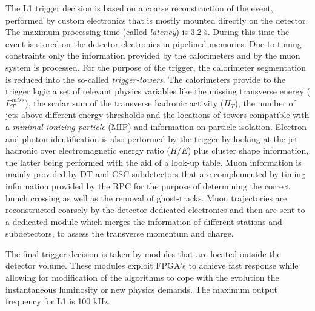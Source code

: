 The L1 trigger decision is based on a coarse reconstruction of the event, performed by custom electronics that is mostly mounted directly on the detector. 
The maximum processing time (called \emph{latency}) is 3.2 \u s. 
During this time the event is stored on the detector electronics in pipelined memories. 
Due to timing constraints only the information provided by the calorimeters and by the muon system is processed. 
For the purpose of the trigger, the calorimeter segmentation is reduced into the so-called \emph{trigger-towers}. 
The calorimeters provide to the trigger logic a set of relevant physics variables like the missing transverse energy ($E_T^{miss}$), the scalar sum of the transverse hadronic activity ($H_T$), the number of jets above different energy thresholds and the locations of towers compatible with a \emph{minimal ionizing particle} (MIP) and information on particle isolation. 
Electron and photon identification is also performed by the trigger by looking at the jet hadronic over electromagnetic energy ratio ($H/E$) plus cluster shape information, the latter being performed with the aid of a look-up table. 
Muon information is mainly provided by DT and CSC subdetectors that are complemented by timing information provided by the RPC for the purpose of determining the correct bunch crossing as well as the removal of ghost-tracks. 
Muon trajectories are reconstructed coarsely by the detector dedicated electronics and then are sent to a dedicated module which merges the information of different stations and subdetectors, to assess the transverse momentum  and charge. 

The final trigger decision is taken by modules that are located outside the detector volume. These modules exploit FPGA's to achieve fast response while allowing for modification of the algorithms to cope with the evolution the instantaneous luminosity or new physics demands. The maximum output frequency for L1 is 100 kHz.


